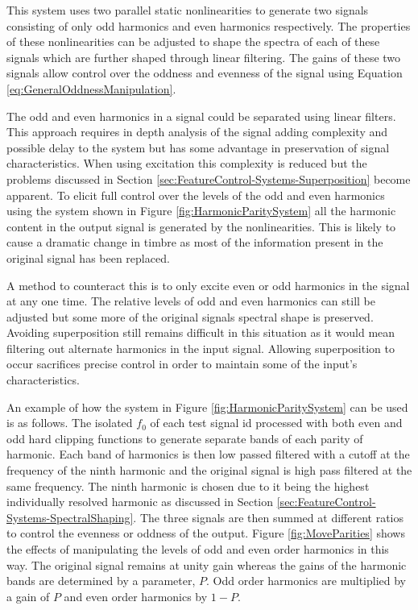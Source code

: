 		This system uses two parallel static nonlinearities to generate two signals consisting of only odd
		harmonics and even harmonics respectively. The properties of these nonlinearities can be adjusted to shape
		the spectra of each of these signals which are further shaped through linear filtering.  The gains of these
		two signals allow control over the oddness and evenness of the signal using Equation
		\ref{eq:GeneralOddnessManipulation}.

		The odd and even harmonics in a signal could be separated using linear filters. This approach requires in
		depth analysis of the signal adding complexity and possible delay to the system but has some advantage in
		preservation of signal characteristics. When using excitation this complexity is reduced but the problems
		discussed in Section \ref{sec:FeatureControl-Systems-Superposition} become apparent. To elicit full control
		over the levels of the odd and even harmonics using the system shown in Figure
		\ref{fig:HarmonicParitySystem} all the harmonic content in the output signal is generated by the
		nonlinearities. This is likely to cause a dramatic change in timbre as most of the information present in
		the original signal has been replaced. 

		A method to counteract this is to only excite even or odd harmonics in the signal at any one time.  The
		relative levels of odd and even harmonics can still be adjusted but some more of the original signals
		spectral shape is preserved. Avoiding superposition still remains difficult in this situation as it would
		mean filtering out alternate harmonics in the input signal. Allowing superposition to occur sacrifices
		precise control in order to maintain some of the input's characteristics.

		An example of how the system in Figure \ref{fig:HarmonicParitySystem} can be used is as follows.  The
		isolated $f_{0}$ of each test signal id processed with both even and odd hard clipping functions to
		generate separate bands of each parity of harmonic. Each band of harmonics is then low passed filtered with
		a cutoff at the frequency of the ninth harmonic and the original signal is high pass filtered at the same
		frequency. The ninth harmonic is chosen due to it being the highest individually resolved harmonic as
		discussed in Section \ref{sec:FeatureControl-Systems-SpectralShaping}. The three signals are then summed at
		different ratios to control the evenness or oddness of the output. Figure \ref{fig:MoveParities} shows the
		effects of manipulating the levels of odd and even order harmonics in this way. The original signal remains
		at unity gain whereas the gains of the harmonic bands are determined by a parameter, $P$.  Odd order
		harmonics are multiplied by a gain of $P$ and even order harmonics by $1 - P$.

